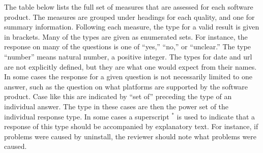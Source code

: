 The table below lists the full set of measures that are assessed for each
software product.  The measures are grouped under headings for each quality, and
one for summary information.  Following each measure, the type for a valid
result is given in brackets.  Many of the types are given as enumerated sets.
For instance, the response on many of the questions is one of ``yes,'' ``no,''
or ``unclear.''  The type ``number'' means natural number, a positive integer.  The
types for date and url are not explicitly defined, but they are what one would
expect from their names.  In some cases the response for a given question is not
necessarily limited to one answer, such as the question on what platforms are
supported by the software product.  Case like this are indicated by ``set of''
preceding the type of an individual answer.  The type in these cases are then
the power set of the individual response type.  In some cases a superscript $^*$
is used to indicate that a response of this type should be accompanied by
explanatory text.  For instance, if problems were caused by uninstall, the
reviewer should note what problems were caused.

